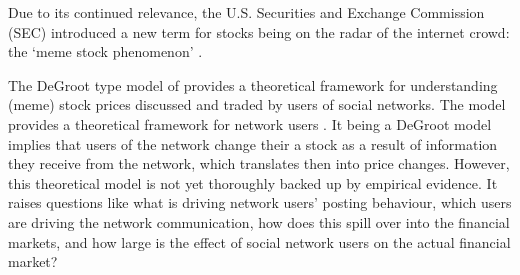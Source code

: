 Due to its continued relevance, the U.S. Securities and Exchange Commission (SEC) introduced a new term for stocks being on the radar of the internet crowd: the `meme stock phenomenon' \citep{Securities2021}. 

The DeGroot type model of \citet{Pedersen2022} provides a theoretical framework for understanding (meme) stock prices discussed and traded by users of social networks. The model provides a theoretical framework for network users . It being a DeGroot model implies that users of the network change their  a stock as a result of information they receive from the network, which translates then into price changes. However, this theoretical model is not yet thoroughly backed up by empirical evidence. It raises questions like what is driving network users' posting behaviour, which users are driving the network communication, how does this spill over into the financial markets, and how large is the effect of social network users on the actual financial market?

